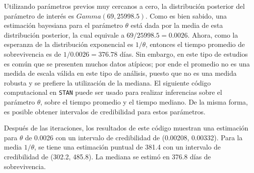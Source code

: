 \documentclass[
  10pt,
  spanish,
]{book}
\newenvironment{Shaded}{\begin{snugshade}}{\end{snugshade}}
\newcommand{\AttributeTok}[1]{\textcolor[rgb]{0.77,0.63,0.00}{#1}}
\newcommand{\ConstantTok}[1]{\textcolor[rgb]{0.00,0.00,0.00}{#1}}
\newcommand{\FunctionTok}[1]{\textcolor[rgb]{0.00,0.00,0.00}{#1}}
\newcommand{\NormalTok}[1]{#1}
\newcommand{\OtherTok}[1]{\textcolor[rgb]{0.56,0.35,0.01}{#1}}
\newcommand{\SpecialCharTok}[1]{\textcolor[rgb]{0.00,0.00,0.00}{#1}}
\newcommand{\StringTok}[1]{\textcolor[rgb]{0.31,0.60,0.02}{#1}}
\theoremstyle{definition}
\theoremstyle{definition}
\theoremstyle{definition}
\theoremstyle{definition}
\theoremstyle{remark}
\begin{document}
Utilizando parámetros previos muy cercanos a cero, la distribución posterior del parámetro de interés es \(Gamma(69, 25998.5)\). Como es bien sabido, una estimación bayesiana para el parámetro \(\theta\) está dada por la media de esta distribución posterior, la cual equivale a \(69/25998.5=0.0026\). Ahora, como la esperanza de la distribución exponencial es \(1/\theta\), entonces el tiempo promedio de sobrevivencia es de \(1/0.0026=376.78\) días. Sin embargo, en este tipo de estudios es común que se presenten muchos datos atípicos; por ende el promedio no es una medida de escala válida en este tipo de análisis, puesto que no es una medida robusta y se prefiere la utilización de la mediana. El siguiente código computacional en \texttt{STAN} puede ser usado para realizar inferencias sobre el parámetro \(\theta\), sobre el tiempo promedio y el tiempo mediano. De la misma forma, es posible obtener intervalos de credibilidad para estos parámetros.

\begin{Shaded}
\end{Shaded}

Después de las iteraciones, los resultados de este código muestran una estimación para \(\theta\) de 0.0026 con un intervalo de credibilidad de (0.00208, 0.00332). Para la media \(1/\theta\), se tiene una estimación puntual de 381.4 con un intervalo de credibilidad de (302.2, 485.8). La mediana se estimó en 376.8 días de sobrevivencia.
\end{document}
